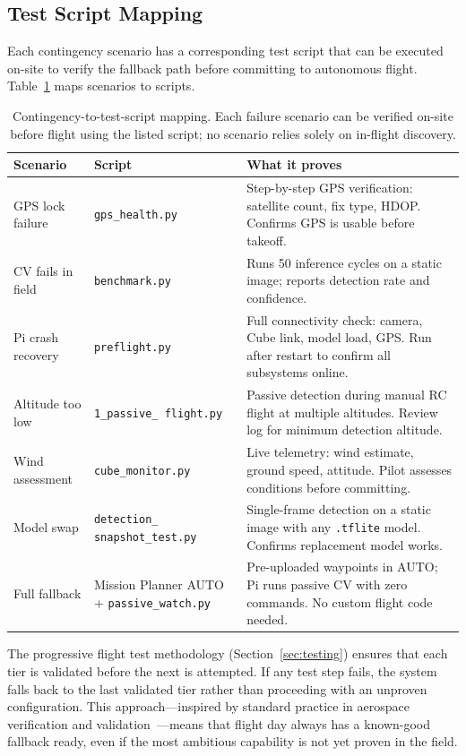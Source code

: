 \subsection{Test Script Mapping}\label{sec:test-mapping}

Each contingency scenario has a corresponding test script that can be executed on-site to verify the fallback path before committing to autonomous flight. Table~\ref{tab:test-scripts} maps scenarios to scripts.

\begin{table}[htbp]
  \centering\small
  \caption{Contingency-to-test-script mapping.  Each failure scenario can be verified on-site before flight using the listed script; no scenario relies solely on in-flight discovery.}\label{tab:test-scripts}
  \begin{tabularx}{\linewidth}{@{}p{2.2cm}p{3.2cm}X@{}}
    \toprule
    \textbf{Scenario} & \textbf{Script} & \textbf{What it proves} \\
    \midrule
    GPS lock failure & \texttt{gps\_health.py} & Step-by-step GPS verification: satellite count, fix type, HDOP. Confirms GPS is usable before takeoff. \\
    CV fails in field & \texttt{benchmark.py} & Runs 50 inference cycles on a static image; reports detection rate and confidence. \\
    Pi crash recovery & \texttt{preflight.py} & Full connectivity check: camera, Cube link, model load, GPS. Run after restart to confirm all subsystems online. \\
    Altitude too low & \texttt{1\_passive\_ flight.py} & Passive detection during manual RC flight at multiple altitudes. Review log for minimum detection altitude. \\
    Wind assessment & \texttt{cube\_monitor.py} & Live telemetry: wind estimate, ground speed, attitude. Pilot assesses conditions before committing. \\
    Model swap & \texttt{detection\_ snapshot\_test.py} & Single-frame detection on a static image with any \texttt{.tflite} model. Confirms replacement model works. \\
    Full fallback & Mission Planner AUTO + \texttt{passive\_watch.py} & Pre-uploaded waypoints in AUTO; Pi runs passive CV with zero commands. No custom flight code needed. \\
    \bottomrule
  \end{tabularx}
\end{table}

The progressive flight test methodology (Section~\ref{sec:testing}) ensures that each tier is validated before the next is attempted. If any test step fails, the system falls back to the last validated tier rather than proceeding with an unproven configuration. This approach---inspired by standard practice in aerospace verification and validation~\cite{rtca_do178c}---means that flight day always has a known-good fallback ready, even if the most ambitious capability is not yet proven in the field.
